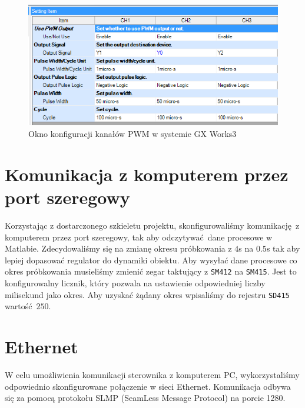 \begin{figure}[h]
    \label{PLC::Konfiguracja::HIOEN::WindowCH5}
    \centering
    \includegraphics[scale=0.58]{./sections/inteco/images/pwm.png}
    \caption{Okno konfiguracji kanałów PWM w systemie GX Works3}
\end{figure}


\section{Komunikacja z komputerem przez port szeregowy}
\label{inteco_matlab}
Korzystając z dostarczonego szkieletu projektu, skonfigurowaliśmy komunikację z komputerem
przez port szeregowy, tak aby odczytywać dane procesowe w Matlabie. Zdecydowaliśmy się 
na zmianę okresu próbkowania z $\num{4}$s na $\num{0.5}$s tak aby lepiej dopasować regulator
do dynamiki obiektu. Aby wysyłać dane procesowe co okres próbkowania musieliśmy zmienić 
zegar taktujący z \texttt{SM412} na \texttt{SM415}. Jest to konfigurowalny licznik, który 
pozwala na ustawienie odpowiedniej liczby milisekund jako okres. Aby uzyskać żądany okres
wpisaliśmy do rejestru \texttt{SD415} wartość $\num{250}$.


\section{Ethernet}
\label{PLC::Konfiguracja::Ethernet}
W celu umożliwienia komunikacji sterownika z komputerem PC, wykorzystaliśmy odpowiednio 
skonfigurowane
połączenie w sieci Ethernet. Komunikacja odbywa się za pomocą protokołu SLMP (SeamLess 
Message Protocol) na porcie 1280. 

